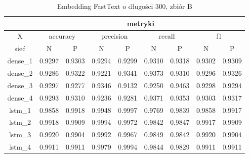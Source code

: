 \begin{table}[p]  \centering
    \caption{Embedding FastText o długości 300, zbiór B}
    \label{tab:wyniki_fasttext_B}
    \begin{tabular} {|c|c|c|c|c|c|c|c|c| }    \hline
                 & \multicolumn{8}{c|}{metryki}                                                                                                                               \\ \hline
        X        & \multicolumn{2}{c|}{accuracy} & \multicolumn{2}{c|}{precision} & \multicolumn{2}{c|}{recall} & \multicolumn{2}{c|}{f1}                                     \\ \hline
        sieć     & N                             & P                              & N                           & P                       & N      & P      & N      & P      \\ \hline
        dense\_1 & 0.9297                        & 0.9303                         & 0.9294                      & 0.9299                  & 0.9310 & 0.9318 & 0.9302 & 0.9309 \\ \hline
        dense\_2 & 0.9286                        & 0.9322                         & 0.9221                      & 0.9341                  & 0.9373 & 0.9310 & 0.9296 & 0.9326 \\ \hline
        dense\_3 & 0.9297                        & 0.9277                         & 0.9346                      & 0.9132                  & 0.9250 & 0.9463 & 0.9298 & 0.9294 \\ \hline
        dense\_4 & 0.9293                        & 0.9310                         & 0.9236                      & 0.9281                  & 0.9371 & 0.9353 & 0.9303 & 0.9317 \\ \hline
        lstm\_1  & 0.9858                        & 0.9918                         & 0.9948                      & 0.9997                  & 0.9769 & 0.9839 & 0.9858 & 0.9917 \\ \hline
        lstm\_2  & 0.9918                        & 0.9909                         & 0.9994                      & 0.9972                  & 0.9842 & 0.9847 & 0.9917 & 0.9909 \\ \hline
        lstm\_3  & 0.9920                        & 0.9904                         & 0.9992                      & 0.9967                  & 0.9849 & 0.9842 & 0.9920 & 0.9904 \\ \hline
        lstm\_4  & 0.9911                        & 0.9911                         & 0.9979                      & 0.9994                  & 0.9844 & 0.9829 & 0.9911 & 0.9911 \\ \hline

\end{tabular}
\end{table}

